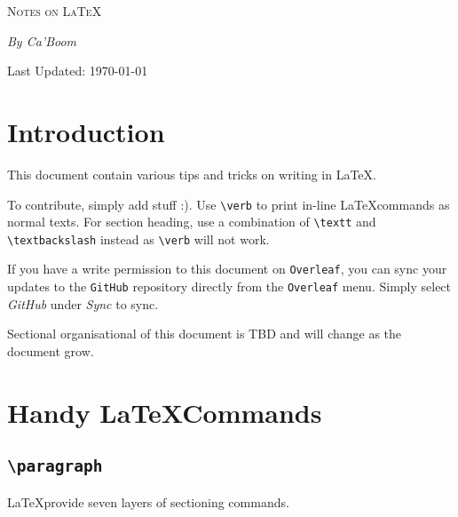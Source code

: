 \documentclass[a4paper,12pt]{article}
\begin{document}
\begin{titlepage}
    \centering
    \vspace*{3cm}  %
    {\scshape \Huge Notes on \LaTeX \par}
    \vspace{6cm}
    {\LARGE \itshape By Ca'Boom \par}
    \vspace{6cm}
    {\Large Last Updated: \today \par}
    \vfill

\end{titlepage}

\section{Introduction}

This document contain various tips and tricks on writing in \LaTeX.

To contribute, simply add stuff :). Use \verb|\verb| to print in-line \LaTeX commands as normal texts. For section heading, use a combination of \verb|\textt| and \verb|\textbackslash| instead as \verb|\verb| will not work.

If you have a write permission to this document on \texttt{Overleaf}, you can sync your updates to the \texttt{GitHub} repository directly from the \texttt{Overleaf} menu. Simply select \emph{GitHub} under \emph{Sync} to sync.

Sectional organisational of this document is TBD and will change as the document grow.

\section{Handy \LaTeX Commands}

\subsection{\texttt{\textbackslash paragraph}}
\LaTeX provide seven layers of sectioning commands.
\end{document}

